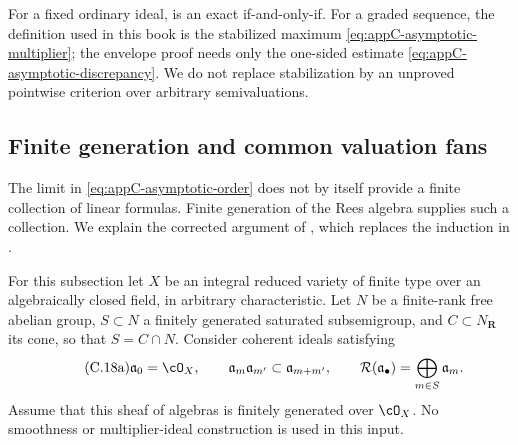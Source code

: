 \begin{remark}
\label{rem:appC-asymptotic-valuative-safeguard}
For a fixed ordinary ideal,  is
an exact if-and-only-if.  For a graded sequence, the definition used in
this book is the stabilized maximum
\eqref{eq:appC-asymptotic-multiplier}; the envelope proof needs only the
one-sided estimate \eqref{eq:appC-asymptotic-discrepancy}.  We do not
replace stabilization by an unproved pointwise criterion over arbitrary
semivaluations.
\end{remark}

\subsection{Finite generation and common valuation fans}
\label{sec:appC-finite-generation-fans}

The limit in \eqref{eq:appC-asymptotic-order} does not by itself provide
a finite collection of linear formulas. Finite generation of the Rees
algebra supplies such a collection. We explain the corrected argument
of \cite[Proposition~1.1 and Lemma~2.1]{ELMNP23BaseLocusErratumV1},
which replaces the induction in
\cite[Proposition~4.7]{ELMNP06BaseLociPublished}.

For this subsection let $X$ be an integral reduced variety of finite type
over an algebraically closed field, in arbitrary characteristic.
Let $N$ be a finite-rank free abelian group, $S\subset N$ a finitely
generated saturated subsemigroup, and $C\subset N_{\mathbf R}$ its cone,
so that $S=C\cap N$. Consider coherent ideals satisfying
\[\tag{C.18a}\label{eq:appC-multigraded-rees}
 \mathfrak a_0=\cO_X,\qquad
 \mathfrak a_m\mathfrak a_{m'}\subset\mathfrak a_{m+m'},\qquad
 \mathcal R(\mathfrak a_\bullet)=\bigoplus_{m\in S}\mathfrak a_m.
\]
Assume that this sheaf of algebras is finitely generated over $\cO_X$.
No smoothness or multiplier-ideal construction is used in this input.

